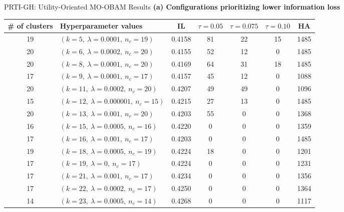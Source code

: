 \documentclass[9pt]{beamer}
\begin{document}
\begin{frame}[t]{PRTI-GH: Utility-Oriented MO-OBAM Results}
    \scriptsize
    \centering
    \textbf{(a) Configurations prioritizing lower information loss}

    \vspace{0.12cm}
    \renewcommand{\arraystretch}{0.98}
    \setlength{\tabcolsep}{2.4pt}

    {\tiny
    \begin{tabular*}{\textwidth}{@{}@{\extracolsep{\fill}}clccccc@{}}
        \toprule
        \textbf{\# of clusters} & \textbf{Hyperparameter values} & \textbf{IL} &
        \textbf{$\tau=0.05$} & \textbf{$\tau=0.075$} &
        \textbf{$\tau=0.10$} & \textbf{HA} \\
        \midrule
        19 & $(k=5,\ \lambda=0.0001,\ n_c=19)$             & 0.4158 & 81 & 22 & 15 & 1485 \\
        20 & $(k=6,\ \lambda=0.0002,\ n_c=20)$             & 0.4155 & 52 & 12 &  0 & 1485 \\
        20 & $(k=8,\ \lambda=0.0001,\ n_c=20)$             & 0.4169 & 64 & 31 & 18 & 1485 \\
        17 & $(k=9,\ \lambda=0.0001,\ n_c=17)$             & 0.4157 & 45 & 12 &  0 & 1088 \\
        20 & $(k=11,\ \lambda=0.0002,\ n_c=20)$            & 0.4207 & 49 & 49 &  0 & 1096 \\
        15 & $(k=12,\ \lambda=0.000001,\ n_c=15)$          & 0.4215 & 27 & 13 &  0 & 1485 \\
        20 & $(k=13,\ \lambda=0.001,\ n_c=20)$             & 0.4203 & 55 &  0 &  0 & 1368 \\
        16 & $(k=15,\ \lambda=0.0005,\ n_c=16)$            & 0.4220 &  0 &  0 &  0 & 1359 \\
        17 & $(k=16,\ \lambda=0.001,\ n_c=17)$             & 0.4203 &  0 &  0 &  0 & 1485 \\
        19 & $(k=18,\ \lambda=0.0005,\ n_c=19)$            & 0.4224 & 18 &  0 &  0 & 1201 \\
        17 & $(k=19,\ \lambda=0,\ n_c=17)$                 & 0.4224 &  0 &  0 &  0 & 1231 \\
        17 & $(k=21,\ \lambda=0.001,\ n_c=17)$             & 0.4234 &  0 &  0 &  0 & 1356 \\
        17 & $(k=22,\ \lambda=0.0002,\ n_c=17)$            & 0.4250 &  0 &  0 &  0 & 1364 \\
        14 & $(k=23,\ \lambda=0.0005,\ n_c=14)$            & 0.4268 &  0 &  0 &  0 & 1117 \\

\end{tabular*}}
\end{frame}
\end{document}
